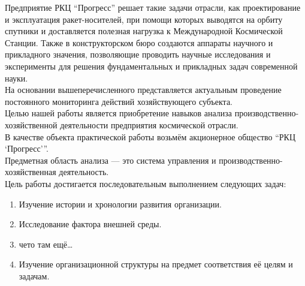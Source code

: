 Предприятие {РКЦ \enquote{Прогресс}} решает такие задачи отрасли, как проектирование и эксплуатация ракет-носителей, при помощи которых выводятся на орбиту спутники и доставляется полезная нагрузка к Международной Космической Станции. Также в конструкторском бюро создаются аппараты научного и прикладного значения, позволяющие проводить научные исследования и эксперименты для решения фундаментальных и прикладных задач современной науки.\\
На основании вышеперечисленного представляется актуальным проведение постоянного мониторинга действий хозяйствующего субъекта.\\
Целью нашей работы является приобретение навыков анализа производственно-хозяйственной деятельности предприятия космической отрасли.\\
В качестве объекта практической работы возьмём акционерное общество \enquote{РКЦ \enquote{Прогресс}}.\\
Предметная область анализа --- это система управления и производственно-хозяйственная деятельность.\\
Цель работы достигается последовательным выполнением следующих задач:
\begin{enumerate}
    \item Изучение истории и хронологии развития организации.
    \item Исследование фактора внешней среды.
    \item чето там ещё\dots
    \item Изучение организационной структуры на предмет соответствия её целям и задачам.
\end{enumerate}
\pagebreak